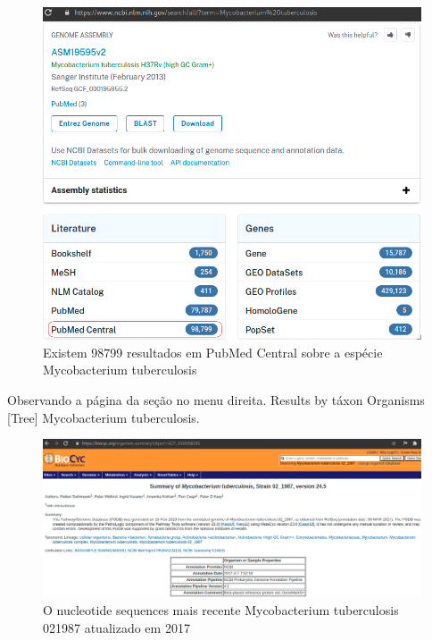 




\begin{figure}[!htp]
    \centering
    \includegraphics[scale=.385]{img/pubmed_central.png}
    \caption{Existem 98799 resultados em PubMed Central sobre a espécie Mycobacterium tuberculosis}
    \label{img:mtb.pubmed_central}
\end{figure}



\newpage
{} 

Observando a página da seção no menu direita. 
Results by táxon Organisms  [Tree] Mycobacterium tuberculosis.


\begin{figure}[!htp]
    \centering
    \includegraphics[scale=.35]{img/mtb2017.png}
    \caption{O nucleotide sequences mais recente Mycobacterium tuberculosis 02\underline{\hspace{.1in}}1987 atualizado em 2017}
    \label{img:mtb.nucleotide}
\end{figure}


